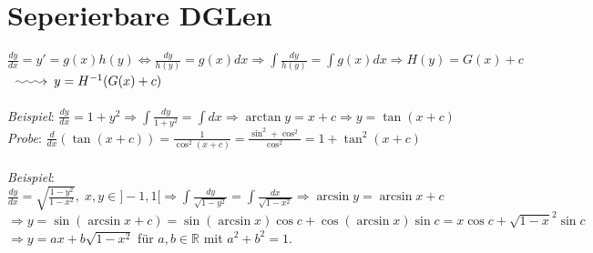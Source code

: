\documentclass[12pt,a4paper,titlepage]{article}
\makeatletter
\newcommand{\longsquiggly}{\xymatrix{{}\ar@{~>}[r]&{}}}
\makeatother
\begin{document}
\section*{Seperierbare DGLen}
$\frac{dy}{dx}=y'=g(x)h(y) \iff \frac{dy}{h(y)}=g(x)dx \Rightarrow \int\frac{dy}{h(y)}=\int g(x)dx \Rightarrow H(y)=G(x)+c$\\
$\longsquiggly y=H^{-1}(G(x)+c)$\\
\\
\textit{Beispiel}: $\frac{dy}{dx}=1+y^2 \Rightarrow \int\frac{dy}{1+y^2}=\int dx \Rightarrow \arctan y = x+c \Rightarrow y=\tan(x+c)$ \\
\textit{Probe}: $\frac{d}{dx}(\tan(x+c))=\frac{1}{\cos^2(x+c)}=\frac{\sin^2+\cos^2}{\cos^2}=1+\tan^2(x+c)$ \\
\\
\textit{Beispiel}: $\frac{dy}{dx}=\sqrt{\frac{1-y^2}{1-x^2}},\; x,y\in]-1,1[ \Rightarrow \int\frac{dy}{\sqrt{1-y^2}}=\int\frac{dx}{\sqrt{1-x^2}} \Rightarrow \arcsin y=\arcsin x+c$\\
$\Rightarrow y=\sin(\arcsin x+c)=\sin(\arcsin x)\cos c+\cos(\arcsin x)\sin c = x\cos c+\sqrt{1-x}^2\sin c$ \\
$\Rightarrow y=ax+b\sqrt{1-x^2}$ für $a,b\in\mathbb{R}$ mit $a^2+b^2=1$.\\
\end{document}
